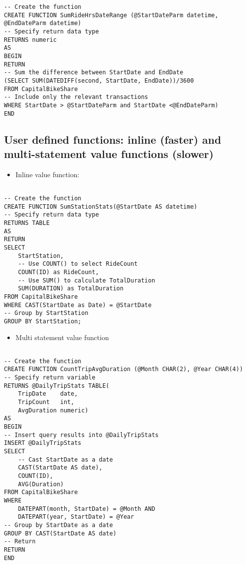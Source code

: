 \documentclass[]{book}
\providecommand{\tightlist}{%
  \setlength{\itemsep}{0pt}\setlength{\parskip}{0pt}}
\begin{document}
\begin{verbatim}
-- Create the function
CREATE FUNCTION SumRideHrsDateRange (@StartDateParm datetime, @EndDateParm datetime)
-- Specify return data type
RETURNS numeric
AS
BEGIN
RETURN
-- Sum the difference between StartDate and EndDate
(SELECT SUM(DATEDIFF(second, StartDate, EndDate))/3600
FROM CapitalBikeShare
-- Include only the relevant transactions
WHERE StartDate > @StartDateParm and StartDate <@EndDateParm)
END
\end{verbatim}

\hypertarget{user-defined-functions-inline-faster-and-multi-statement-value-functions-slower}{%
\subsection{User defined functions: inline (faster) and multi-statement value functions (slower)}\label{user-defined-functions-inline-faster-and-multi-statement-value-functions-slower}}

\begin{itemize}
\tightlist
\item
  Inline value function:
\end{itemize}

\begin{verbatim}

-- Create the function
CREATE FUNCTION SumStationStats(@StartDate AS datetime)
-- Specify return data type
RETURNS TABLE
AS
RETURN
SELECT
	StartStation,
    -- Use COUNT() to select RideCount
	COUNT(ID) as RideCount,
    -- Use SUM() to calculate TotalDuration
    SUM(DURATION) as TotalDuration
FROM CapitalBikeShare
WHERE CAST(StartDate as Date) = @StartDate
-- Group by StartStation
GROUP BY StartStation;
\end{verbatim}

\begin{itemize}
\tightlist
\item
  Multi statement value function
\end{itemize}

\begin{verbatim}

-- Create the function
CREATE FUNCTION CountTripAvgDuration (@Month CHAR(2), @Year CHAR(4))
-- Specify return variable
RETURNS @DailyTripStats TABLE(
	TripDate	date,
	TripCount	int,
	AvgDuration	numeric)
AS
BEGIN
-- Insert query results into @DailyTripStats
INSERT @DailyTripStats
SELECT
    -- Cast StartDate as a date
	CAST(StartDate AS date),
    COUNT(ID),
    AVG(Duration)
FROM CapitalBikeShare
WHERE
	DATEPART(month, StartDate) = @Month AND
    DATEPART(year, StartDate) = @Year
-- Group by StartDate as a date
GROUP BY CAST(StartDate AS date)
-- Return
RETURN
END
\end{verbatim}
\end{document}
